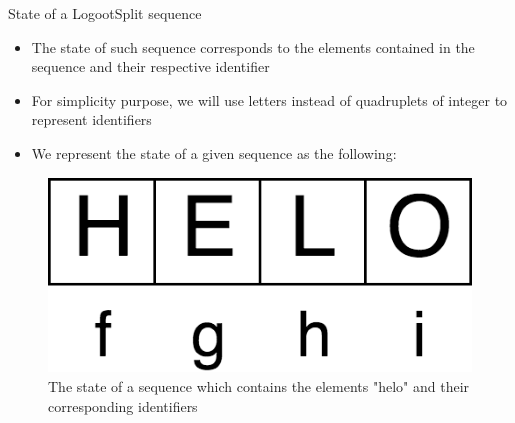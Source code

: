 \documentclass[10pt]{beamer}
\begin{document}
\begin{frame}{State of a LogootSplit sequence}

  \begin{itemize}
    \item The state of such sequence corresponds to the elements contained in the sequence and their respective identifier
    \item For simplicity purpose, we will use letters instead of quadruplets of integer to represent identifiers
    \item We represent the state of a given sequence as the following:
  \end{itemize}

  \begin{figure}
    \includegraphics[scale=0.15]{img/helo-as-letters.png}
    \caption{The state of a sequence which contains the elements "helo" and their corresponding identifiers}
  \end{figure}

\end{frame}
\end{document}
